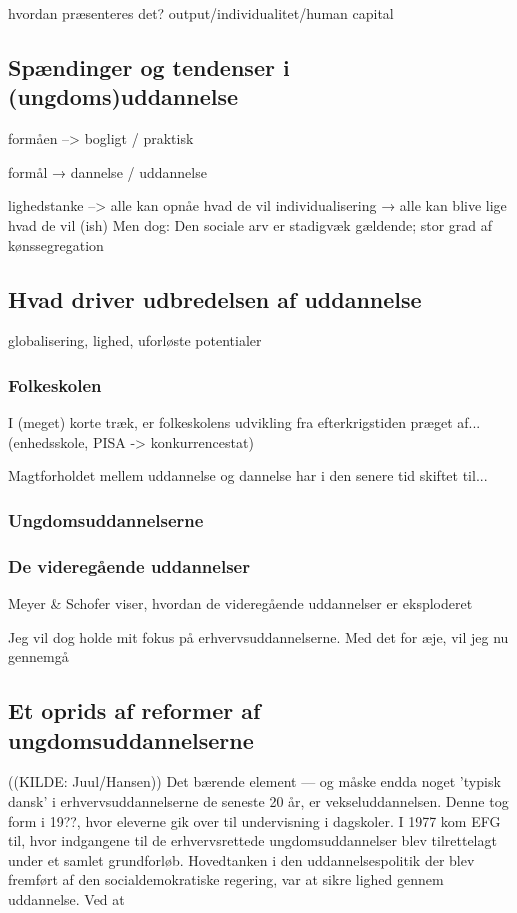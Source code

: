 



hvordan præsenteres det? output/individualitet/human capital
\subsection{Spændinger og tendenser i (ungdoms)uddannelse}

formåen --> bogligt / praktisk

formål → dannelse / uddannelse

lighedstanke --> alle kan opnåe hvad de vil
individualisering → alle kan blive lige hvad de vil (ish)
Men dog: Den sociale arv er stadigvæk gældende; stor grad af kønssegregation


\subsection{Hvad driver udbredelsen af uddannelse}


globalisering, lighed, uforløste potentialer

\subsubsection{Folkeskolen}
I (meget) korte træk, er folkeskolens udvikling fra efterkrigstiden præget af... (enhedsskole, PISA -> konkurrencestat)

Magtforholdet mellem uddannelse og dannelse har i den senere tid skiftet til...

\subsubsection{Ungdomsuddannelserne}

\subsubsection{De videregående uddannelser}
Meyer & Schofer  viser, hvordan de videregående uddannelser er eksploderet 

Jeg vil dog holde mit fokus på erhvervsuddannelserne.
Med det for æje, vil jeg nu gennemgå 
\subsection{Et oprids af reformer af ungdomsuddannelserne}
((KILDE: Juul/Hansen))
Det bærende element --- og måske endda noget 'typisk dansk' i erhvervsuddannelserne de seneste 20 år, er vekseluddannelsen.
Denne tog form i 19??, hvor eleverne gik over til undervisning i dagskoler.
I 1977 kom EFG til, hvor indgangene til de erhvervsrettede ungdomsuddannelser blev tilrettelagt under et samlet grundforløb.
Hovedtanken i den uddannelsespolitik der blev fremført af den socialdemokratiske regering, var at sikre lighed gennem uddannelse.
Ved at 

